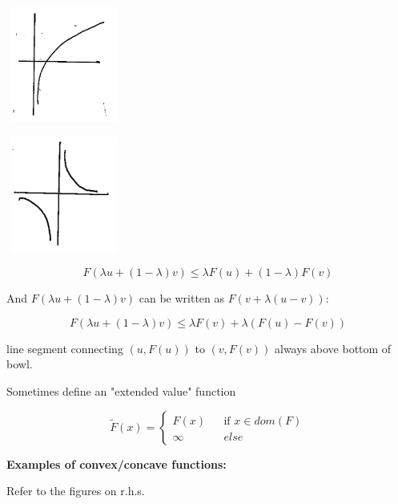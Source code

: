 \begin{marginfigure}
	\centering
	\includegraphics[width=1.5in,height=1.5in]{figures/ch08/figure1030_9.png}
\end{marginfigure}

\begin{marginfigure}
	\centering
	\includegraphics[width=1.5in,height=1.5in]{figures/ch08/figure1030_10.png}
\end{marginfigure}


\begin{equation*}
F(\lambda u + (1-\lambda)v) \leq \lambda F(u) + (1-\lambda)F(v)
\end{equation*}

And $F(\lambda u + (1-\lambda)v)$ can be written as $F(v + \lambda(u-v))$:

\begin{equation*}
F(\lambda u + (1-\lambda)v) \leq \lambda F(v) + \lambda(F(u)-F(v))
\end{equation*}

line segment connecting $(u,F(u))$ to $(v, F(v))$ always above bottom of bowl.


Sometimes define an "extended value" function

$$ \tilde{F}(x)=\left\{
\begin{array}{rcl}
F(x)       &      & \text{if } x\in dom(F)\\
\infty   &      & else
\end{array} \right. 
$$

\textbf{Examples of convex/concave functions:}

Refer to the figures on r.h.s.

